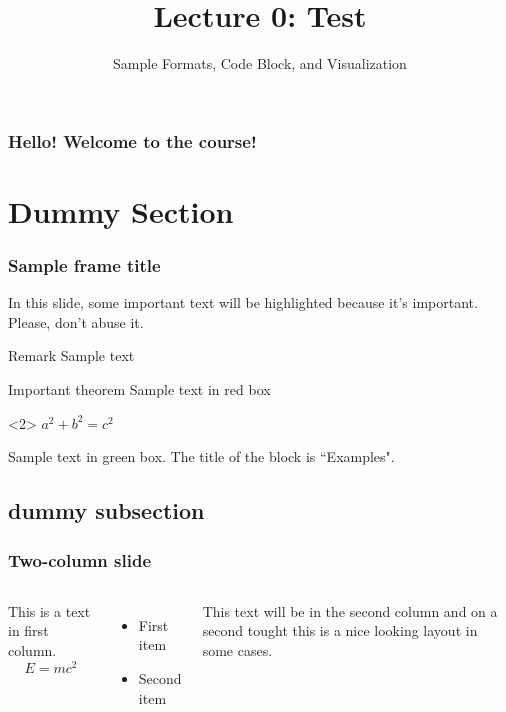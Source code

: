 \documentclass[12pt, aspectratio=169]{beamer}
\title[Lecture 0: Test] %
{\textbf{Lecture 0: Test}}
\subtitle{Sample Formats, Code Block, and Visualization}
\begin{document}
    \maketitle

    \begin{frame}
        \frametitle{Hello! Welcome to the course!}
        \tableofcontents
    \end{frame}

\section{Dummy Section}


\begin{frame}
\frametitle{Sample frame title}

In this slide, some important text will be
\alert{highlighted} because it's important.
Please, don't abuse it.

\begin{block}{Remark}
Sample text
\end{block}

\begin{alertblock}{Important theorem}
Sample text in red box
\end{alertblock}

\begin{theorem}[hello]<2>
    $a^2+b^2=c^2$
\end{theorem}

\begin{examples}
Sample text in green box. The title of the block is ``Examples".
\end{examples}
\end{frame}

\subsection{dummy subsection}
\begin{frame}
\frametitle{Two-column slide}

\begin{columns}

This is a text in first column.
$$E=mc^2$$
\begin{itemize}
\item First item
\item Second item
\end{itemize}

This text will be in the second column
and on a second tought this is a nice looking
layout in some cases.
\end{columns}
\end{frame}
\end{document}
